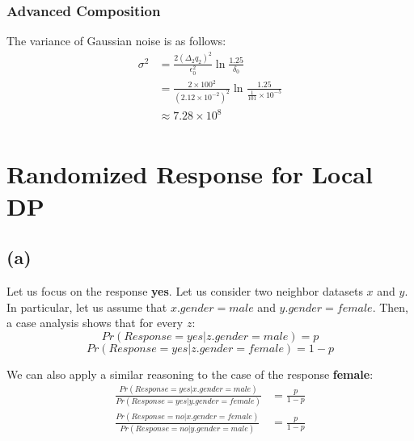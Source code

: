 \documentclass[a4paper,12pt]{article}
\begin{document}
\subsubsection{Advanced Composition}
The variance of Gaussian noise is as follows:
\begin{equation}
    \begin{aligned}
        \sigma^2 & = \frac{2(\Delta_2q_2)^2}{\epsilon_0^2}\ln{\frac{1.25}{\delta_0}}                            \\
                 & = \frac{2\times 100^2}{(2.12 \times 10^{-2})^2}\ln{\frac{1.25}{\frac{1}{101}\times 10^{-5}}} \\
                 & \approx 7.28 \times 10^8                                                                     \\
    \end{aligned}
\end{equation}

\section{Randomized Response for Local DP}
\subsection{(a)}
Let us focus on the response \textbf{yes}. Let us consider two neighbor datasets $x$ and $y$.
In particular, let us assume that $x.gender = male$ and $y.gender = female$.
Then, a case analysis shows that for every $z$:
\begin{equation}
    Pr(Response = yes | z.gender = male) = p
\end{equation}
\begin{equation}
    Pr(Response = yes | z.gender = female) = 1 - p
\end{equation}

We can also apply a similar reasoning to the case of the response \textbf{female}:
\begin{equation}
    \begin{aligned}
        \frac{Pr(Response = yes | x.gender = male)}{Pr(Response = yes | y.gender = female)} & = \frac{p}{1 - p} \\
        \frac{Pr(Response = no | x.gender = female)}{Pr(Response = no | y.gender = male)}   & = \frac{p}{1 - p} \\
    \end{aligned}
\end{equation}
\end{document}
